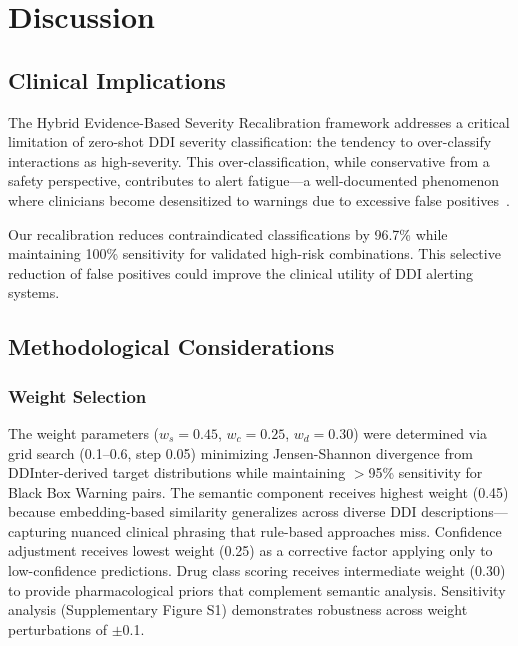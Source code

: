 \documentclass[11pt,a4paper]{article}
\newcommand{\method}{Hybrid Evidence-Based Severity Recalibration}
\begin{document}
\section{Discussion}

\subsection{Clinical Implications}

The \method{} framework addresses a critical limitation of zero-shot DDI severity classification: the tendency to over-classify interactions as high-severity. This over-classification, while conservative from a safety perspective, contributes to alert fatigue---a well-documented phenomenon where clinicians become desensitized to warnings due to excessive false positives~\citep{ancker2017effects}.

Our recalibration reduces contraindicated classifications by 96.7\% while maintaining 100\% sensitivity for validated high-risk combinations. This selective reduction of false positives could improve the clinical utility of DDI alerting systems.

\subsection{Methodological Considerations}

\subsubsection{Weight Selection}

The weight parameters ($w_s = 0.45$, $w_c = 0.25$, $w_d = 0.30$) were determined via grid search (0.1--0.6, step 0.05) minimizing Jensen-Shannon divergence from DDInter-derived target distributions while maintaining $>$95\% sensitivity for Black Box Warning pairs. The semantic component receives highest weight (0.45) because embedding-based similarity generalizes across diverse DDI descriptions---capturing nuanced clinical phrasing that rule-based approaches miss. Confidence adjustment receives lowest weight (0.25) as a corrective factor applying only to low-confidence predictions. Drug class scoring receives intermediate weight (0.30) to provide pharmacological priors that complement semantic analysis. Sensitivity analysis (Supplementary Figure S1) demonstrates robustness across weight perturbations of $\pm$0.1.
\end{document}
